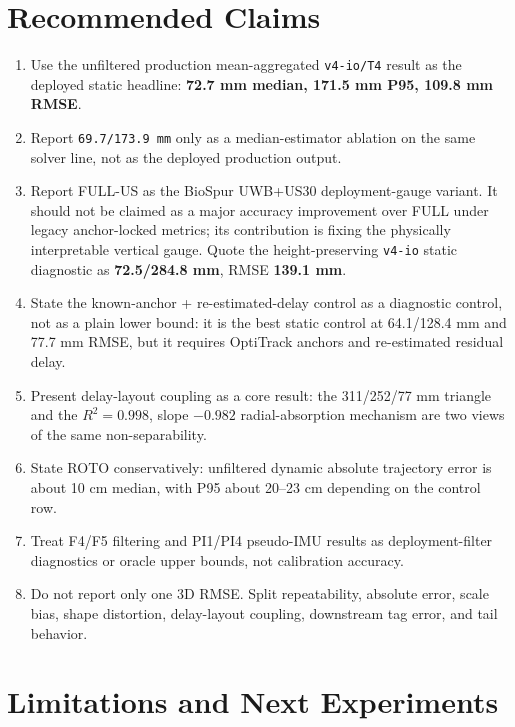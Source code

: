 \documentclass[11pt,a4paper]{article}
\newcommand{\case}[1]{\texttt{#1}}
\begin{document}
\section{Recommended Claims}

\begin{enumerate}
    \item Use the unfiltered production mean-aggregated \case{v4-io/T4} result as
    the deployed static headline: \textbf{72.7 mm median, 171.5 mm P95, 109.8 mm RMSE}.
    \item Report \case{69.7/173.9 mm} only as a median-estimator ablation on the same
    solver line, not as the deployed production output.
    \item Report FULL-US as the BioSpur UWB+US30 deployment-gauge variant.  It should
    not be claimed as a major accuracy improvement over FULL under legacy
    anchor-locked metrics; its contribution is fixing the physically interpretable
    vertical gauge.  Quote the height-preserving \case{v4-io} static diagnostic as
    \textbf{72.5/284.8 mm}, RMSE \textbf{139.1 mm}.
    \item State the known-anchor + re-estimated-delay control as a diagnostic control,
    not as a plain lower bound: it is the best static control at 64.1/128.4 mm and
    77.7 mm RMSE, but it requires OptiTrack anchors and re-estimated residual delay.
    \item Present delay-layout coupling as a core result: the 311/252/77 mm triangle
    and the \(R^2=0.998\), slope \(-0.982\) radial-absorption mechanism are two views
    of the same non-separability.
    \item State ROTO conservatively: unfiltered dynamic absolute trajectory error is
    about 10 cm median, with P95 about 20--23 cm depending on the control row.
    \item Treat F4/F5 filtering and PI1/PI4 pseudo-IMU results as deployment-filter
    diagnostics or oracle upper bounds, not calibration accuracy.
    \item Do not report only one 3D RMSE.  Split repeatability, absolute error, scale
    bias, shape distortion, delay-layout coupling, downstream tag error, and tail behavior.
\end{enumerate}

\section{Limitations and Next Experiments}
\end{document}
